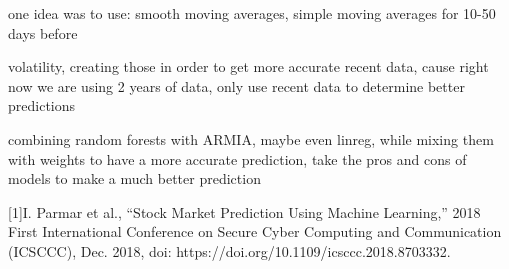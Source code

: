 \documentclass[conference]{IEEEtran}
\begin{document}
one idea was to use:  smooth moving averages, simple moving averages for 10-50 days before

volatility, creating those in order to get more accurate recent data, cause right now we are using 2 years of data, only use recent data to determine better predictions

combining random forests with ARMIA, maybe even linreg, while mixing them with weights to have a more accurate prediction, take the pros and cons of models to make a much better prediction


\begin{thebibliography}{00}
[1]I. Parmar et al., “Stock Market Prediction Using Machine Learning,” 2018 First International Conference on Secure Cyber Computing and Communication (ICSCCC), Dec. 2018, doi: https://doi.org/10.1109/icsccc.2018.8703332.
‌
\end{thebibliography}
\vspace{12pt}
\end{document}
